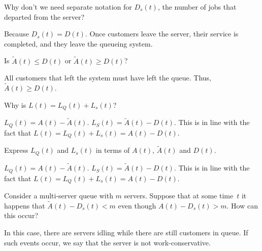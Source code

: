 \begin{exercise}
Why don't we need separate notation for $D_s(t)$, the number
    of jobs that departed from the server? 
\begin{solution}
 Because $D_s(t) = D(t)$. Once customers leave the server,
    their service is completed, and they leave the queueing system.
  \end{solution}
\end{exercise}



\begin{exercise}
 Is $\tilde A(t) \leq D(t)$ or $\tilde A(t) \geq D(t)$?
\begin{solution}
 All customers that left the system must have left the
    queue. Thus, $\tilde A(t) \geq D(t)$.
  \end{solution}
\end{exercise}



\begin{exercise}
 Why is $L(t) = L_Q(t) + L_s(t)$?
\begin{solution}
 $L_Q(t) = A(t) - \tilde A(t)$. $L_S(t) = \tilde A(t) - D(t)$. This is in
    line with the fact that $L(t) = L_Q(t) + L_s(t) = A(t) - D(t)$.
\end{solution}
\end{exercise}



\begin{exercise}
 Express $L_Q(t)$ and $L_s(t)$ in terms of $A(t)$, $\tilde A(t)$ and $D(t)$.
\begin{solution}
 $L_Q(t) = A(t) - \tilde A(t)$. $L_S(t) = \tilde A(t) - D(t)$. This is in
    line with the fact that $L(t) = L_Q(t) + L_s(t) = A(t) - D(t)$.
\end{solution}
\end{exercise}

\begin{exercise}
 Consider a multi-server queue with $m$ servers. Suppose that
    at some time~$t$ it happens that $\tilde A(t) - D_s(t) < m$ even though
    $A(t) - D_s(t) > m$. How can this occur? 
\begin{solution}
 In this case, there are servers idling while there are still
    customers in queue. If such events occur, we say that the server
    is not work-conservative.
\end{solution}
\end{exercise}


